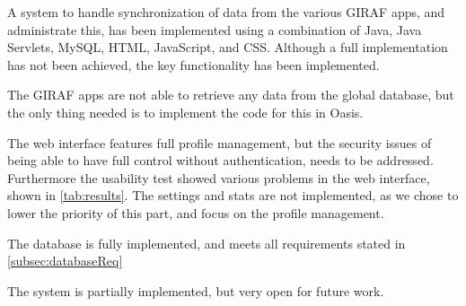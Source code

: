 A system to handle synchronization of data from the various GIRAF apps, and administrate this, has been implemented using a combination of Java, Java Servlets, MySQL, HTML, JavaScript, and CSS.
Although a full implementation has not been achieved, the key functionality has been implemented. 

The GIRAF apps are not able to retrieve any data from the global database, but the only thing needed is to implement the code for this in Oasis. 

The web interface features full profile management, but the security issues of being able to have full control without authentication, needs to be addressed.
 Furthermore the usability test showed various problems in the web interface, shown in \autoref{tab:results}. The settings and stats are not implemented, as we chose to lower the priority of this part, and focus on the profile management.
 
The database is fully implemented, and meets all requirements stated in \autoref{subsec:databaseReq}

The system is partially implemented, but very open for future work.



